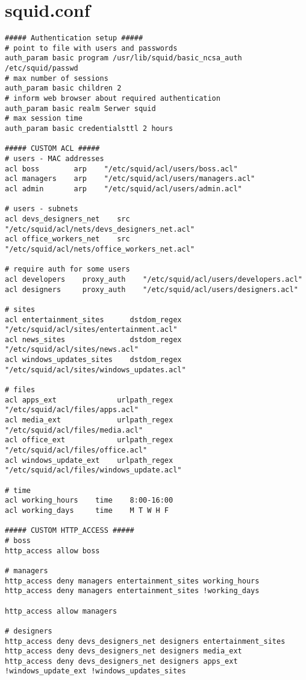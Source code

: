 \documentclass{article}
\begin{document}
\section{squid.conf}
\begin{lstlisting}[caption=Zmiany w pliku squid.conf \label{lst:squid-conf}]
##### Authentication setup #####
# point to file with users and passwords
auth_param basic program /usr/lib/squid/basic_ncsa_auth /etc/squid/passwd
# max number of sessions
auth_param basic children 2
# inform web browser about required authentication
auth_param basic realm Serwer squid
# max session time
auth_param basic credentialsttl 2 hours

##### CUSTOM ACL #####
# users - MAC addresses
acl boss        arp    "/etc/squid/acl/users/boss.acl"
acl managers    arp    "/etc/squid/acl/users/managers.acl"
acl admin       arp    "/etc/squid/acl/users/admin.acl"

# users - subnets
acl devs_designers_net    src    "/etc/squid/acl/nets/devs_designers_net.acl"
acl office_workers_net    src    "/etc/squid/acl/nets/office_workers_net.acl"

# require auth for some users
acl developers    proxy_auth    "/etc/squid/acl/users/developers.acl"
acl designers     proxy_auth    "/etc/squid/acl/users/designers.acl"

# sites
acl entertainment_sites      dstdom_regex    "/etc/squid/acl/sites/entertainment.acl"
acl news_sites               dstdom_regex    "/etc/squid/acl/sites/news.acl"
acl windows_updates_sites    dstdom_regex    "/etc/squid/acl/sites/windows_updates.acl"

# files
acl apps_ext              urlpath_regex    "/etc/squid/acl/files/apps.acl"
acl media_ext             urlpath_regex    "/etc/squid/acl/files/media.acl"
acl office_ext            urlpath_regex    "/etc/squid/acl/files/office.acl"
acl windows_update_ext    urlpath_regex    "/etc/squid/acl/files/windows_update.acl"

# time
acl working_hours    time    8:00-16:00
acl working_days     time    M T W H F

##### CUSTOM HTTP_ACCESS #####
# boss
http_access allow boss

# managers
http_access deny managers entertainment_sites working_hours
http_access deny managers entertainment_sites !working_days

http_access allow managers

# designers
http_access deny devs_designers_net designers entertainment_sites
http_access deny devs_designers_net designers media_ext
http_access deny devs_designers_net designers apps_ext !windows_update_ext !windows_updates_sites


\end{lstlisting}
\end{document}
